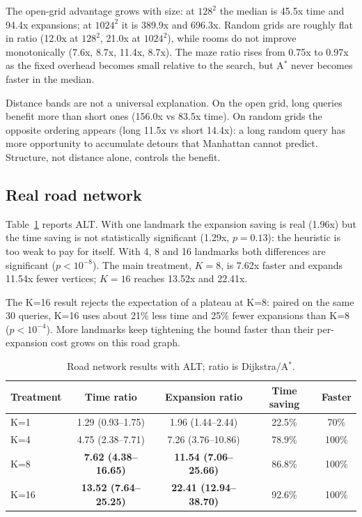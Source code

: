 \documentclass[conference,10pt]{IEEEtran}
\newcommand{\Astar}{A$^\ast$}
\begin{document}
The open-grid advantage grows with size: at $128^2$ the median is 45.5x time
and 94.4x expansions; at $1024^2$ it is 389.9x and 696.3x.  Random grids are
roughly flat in ratio (12.0x at $128^2$, 21.0x at $1024^2$), while rooms do not
improve monotonically (7.6x, 8.7x, 11.4x, 8.7x).  The maze ratio rises from
0.75x to 0.97x as the fixed overhead becomes small relative to the search, but
\Astar{} never becomes faster in the median.

Distance bands are not a universal explanation.  On the open grid, long queries
benefit more than short ones (156.0x vs 83.5x time).  On random grids the
opposite ordering appears (long 11.5x vs short 14.4x): a long random query has
more opportunity to accumulate detours that Manhattan cannot predict.
Structure, not distance alone, controls the benefit.

\subsection{Real road network}
Table~\ref{tab:real} reports ALT.  With one landmark the expansion saving is
real (1.96x) but the time saving is not statistically significant (1.29x,
$p=0.13$): the heuristic is too weak to pay for itself.  With 4, 8 and 16
landmarks both differences are significant ($p<10^{-8}$).  The main treatment,
$K=8$, is 7.62x faster and expands 11.54x fewer vertices; $K=16$ reaches 13.52x
and 22.41x.

The K=16 result rejects the expectation of a plateau at K=8: paired on the same
30 queries, K=16 uses about 21\% less time and 25\% fewer expansions than K=8
($p<10^{-4}$).  More landmarks keep tightening the bound faster than their
per-expansion cost grows on this road graph.

\begin{table}[!t]
\centering
\caption{Road network results with ALT; ratio is Dijkstra/\Astar{}.}
\label{tab:real}
\footnotesize
\setlength{\tabcolsep}{3pt}
\begin{tabular}{lcccc}
\toprule
Treatment & Time ratio & Expansion ratio & Time saving & Faster\\
\midrule
K=1 & 1.29 (0.93--1.75) & 1.96 (1.44--2.44) & 22.5\% & 70\%\\
K=4 & 4.75 (2.38--7.71) & 7.26 (3.76--10.86) & 78.9\% & 100\%\\
K=8 & \textbf{7.62 (4.38--16.65)} & \textbf{11.54 (7.06--25.66)} & 86.8\% & 100\%\\
K=16 & \textbf{13.52 (7.64--25.25)} & \textbf{22.41 (12.94--38.70)} & 92.6\% & 100\%\\
\bottomrule
\end{tabular}
\end{table}
\end{document}
